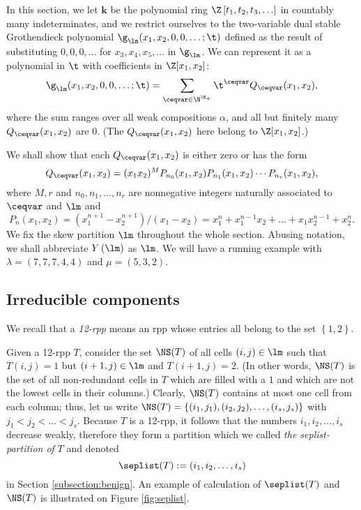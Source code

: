 \documentclass[numbers=enddot,12pt,final,onecolumn,notitlepage]{scrartcl}%
\theoremstyle{definition}
\newcommand{\kk}{\mathbf{k}}
\let\sumnonlimits\sum
\renewcommand{\sum}{\sumnonlimits\limits}
\begin{document}
\def\OneTwoRPP{{\operatorname*{RPP}^{12}\left(  \lambda/\mu\right)}}
\def\OneTwoRPPCutvar{{\operatorname*{RPP}^{12}\left(  \lambda/\mu ;\seplistvar \right)}}
\def\flip{{\operatorname*{flip}}}

In this section, we let $\kk$ be the polynomial ring
$\Z\left[t_1, t_2, t_3, \ldots\right]$ in countably many
indeterminates, and we restrict ourselves to the
two-variable dual stable Grothendieck polynomial
$\g_\lm(x_1,x_2,0,0,\dots;\t)$ defined as the result of
substituting $0, 0, 0, \ldots$ for $x_3, x_4, x_5, \ldots$
in $\g_\lm$. We can represent it as a polynomial in
$\t$ with coefficients in $\Z[x_1,x_2]$:
$$\g_\lm(x_1,x_2,0,0,\dots;\t)=\sum_{\ceqvar\in \N^{\N_+}}\t^\ceqvar Q_\ceqvar(x_1,x_2),$$
where the sum ranges over all weak compositions $\alpha$,
and all but finitely many $Q_\ceqvar(x_1,x_2)$ are $0$.
(The $Q_\ceqvar(x_1,x_2)$ here belong to $\Z[x_1, x_2]$.)

We shall show that each $Q_\ceqvar(x_1,x_2)$ is either zero or has the form
$$Q_\ceqvar(x_1,x_2)=(x_1x_2)^{M} P_{n_0}(x_1,x_2)P_{n_1}(x_1,x_2)\cdots P_{n_r}(x_1,x_2) ,$$
where $M,r$ and $n_0,n_1,\dots,n_{r}$ are nonnegative integers naturally associated to $\ceqvar$ and $\lm$ and 
$$P_n(x_1,x_2)=(x_1^{n+1}-x_2^{n+1})/(x_1-x_2)=x_1^{n}+x_1^{n-1}x_2+\dots+x_1x_2^{n-1}+x_2^n.$$
We fix the skew partition $\lm$ throughout the whole section.
Abusing notation, we shall abbreviate $Y\left(\lm\right)$ as $\lm$.
We will have a running example with $\lambda=(7,7,7,4,4)$ and $\mu=(5,3,2)$.


\subsection{Irreducible components}
We recall that a \textit{12-rpp} means an rpp whose entries all belong to the set $\left\{1, 2\right\}$. 

Given a 12-rpp $T$, consider the set $\NS(T)$ of all cells $(i,j)\in \lm$ such that $T(i,j)=1$ but $(i+1,j) \in \lm$ and $T(i+1,j)=2$. (In other words, $\NS(T)$ is the set of all non-redundant cells in $T$ which are filled with a $1$ and which are not the lowest cells in their columns.)
Clearly, $\NS(T)$ contains at most one cell from each column; thus, let us write $\NS(T)=\{(i_1,j_1),(i_2,j_2),\dots,(i_s,j_s)\}$ with $j_1<j_2<\dots<j_s$. Because $T$ is a 12-rpp, it follows that the numbers $i_1,i_2,\dots,i_s$ decrease weakly, therefore they form a partition which we called \textit{the seplist-partition of} $T$ and denoted 
$$\seplist(T):=(i_1,i_2,\dots,i_s)$$ 
in Section \ref{subsection:benign}.
An example of calculation of $\seplist(T)$ and $\NS(T)$ is illustrated on Figure \ref{fig:seplist}. 
\end{document}
